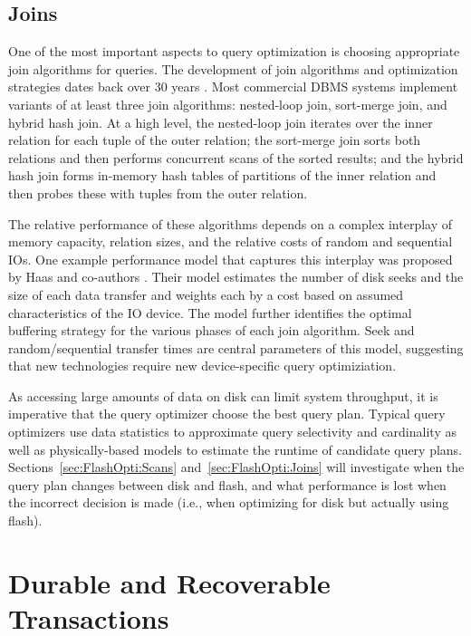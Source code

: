 \subsection{Joins}
\label{sec:Background:Joins}

One of the most important aspects to query optimization is choosing appropriate join algorithms for queries.
The development of join algorithms and optimization strategies dates back over 30 years \cite{Selinger1979,Shapiro1986}. 
Most commercial DBMS systems implement variants of at least three join algorithms: nested-loop join, sort-merge join, and hybrid hash join.
At a high level, the nested-loop join iterates over the inner relation for each tuple of the outer relation; the sort-merge join sorts both relations and then performs concurrent scans of the sorted results; and the hybrid hash join forms in-memory hash tables of partitions of the inner relation and then probes these with tuples from the outer relation.

The relative performance of these algorithms depends on a complex interplay of memory capacity, relation sizes, and the relative costs of random and sequential IOs.  
One example performance model that captures this interplay was proposed by Haas and co-authors \cite{DBLP:journals/vldb/HaasCLS97}.
Their model estimates the number of disk seeks and the size of each data transfer and weights each by a cost based on assumed characteristics of the IO device.
The model further identifies the optimal buffering strategy for the various phases of each join algorithm.
Seek and random/sequential transfer times are central parameters of this model, suggesting that new technologies require new device-specific query optimiziation.

As accessing large amounts of data on disk can limit system throughput, it is imperative that the query optimizer choose the best query plan.
Typical query optimizers use data statistics to approximate query selectivity and cardinality as well as physically-based models to estimate the runtime of candidate query plans.
Sections~\ref{sec:FlashOpti:Scans} and~\ref{sec:FlashOpti:Joins} will investigate when the query plan changes between disk and flash, and what performance is lost when the incorrect decision is made (i.e., when optimizing for disk but actually using flash).

\section{Durable and Recoverable Transactions}
\label{sec:Background:Recovery}

